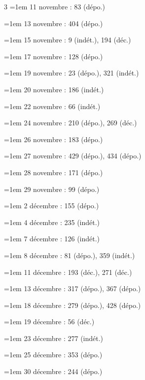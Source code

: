 \begin{multicols}{3}
\hangindent=1em 11 novembre : 83 (dépo.)\par
\hangindent=1em 13 novembre : 404 (dépo.)\par
\hangindent=1em 15 novembre : 9 (indét.), 194 (déc.)\par
\hangindent=1em 17 novembre : 128 (dépo.)\par
\hangindent=1em 19 novembre : 23 (dépo.), 321 (indét.)\par
\hangindent=1em 20 novembre : 186 (indét.)\par
\hangindent=1em 22 novembre : 66 (indét.)\par
\hangindent=1em 24 novembre : 210 (dépo.), 269 (déc.)\par
\hangindent=1em 26 novembre : 183 (dépo.)\par
\hangindent=1em 27 novembre : 429 (dépo.), 434 (dépo.)\par
\hangindent=1em 28 novembre : 171 (dépo.)\par
\hangindent=1em 29 novembre : 99 (dépo.)\par
\hangindent=1em 2 décembre : 155 (dépo.)\par
\hangindent=1em 4 décembre : 235 (indét.)\par
\hangindent=1em 7 décembre : 126 (indét.)\par
\hangindent=1em 8 décembre : 81 (dépo.), 359 (indét.)\par
\hangindent=1em 11 décembre : 193 (déc.), 271 (déc.)\par
\hangindent=1em 13 décembre : 317 (dépo.), 367 (dépo.)\par
\hangindent=1em 18 décembre : 279 (dépo.), 428 (dépo.)\par
\hangindent=1em 19 décembre : 56 (déc.)\par
\hangindent=1em 23 décembre : 277 (indét.)\par
\hangindent=1em 25 décembre : 353 (dépo.)\par
\hangindent=1em 30 décembre : 244 (dépo.)\par\end{multicols}
